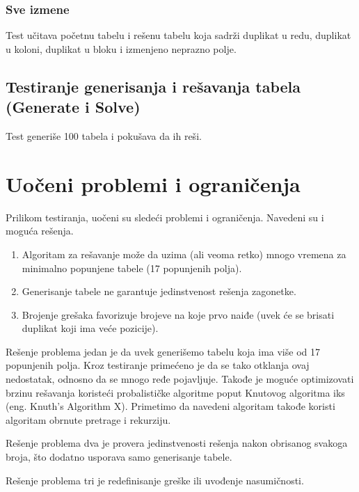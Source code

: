 \documentclass[a4paper]{article}
\begin{document}
    \subsubsection{Sve izmene}
    Test učitava početnu tabelu i rešenu tabelu koja sadrži duplikat u redu, duplikat u koloni, duplikat u bloku i izmenjeno neprazno polje.
    \subsection{Testiranje generisanja i rešavanja tabela (Generate i Solve)}
    Test generiše 100 tabela i pokušava da ih reši.

    \newpage
    \section{Uočeni problemi i ograničenja}
    Prilikom testiranja, uočeni su sledeći problemi i ograničenja. Navedeni su i moguća rešenja.
    \begin{enumerate}
        \item Algoritam za rešavanje može da uzima (ali veoma retko) mnogo vremena za minimalno popunjene tabele (17 popunjenih polja).
        \item Generisanje tabele ne garantuje jedinstvenost rešenja zagonetke.
        \item Brojenje grešaka favorizuje brojeve na koje prvo naiđe (uvek će se brisati duplikat koji ima veće pozicije).
    \end{enumerate}
    \par Rešenje problema jedan je da uvek generišemo tabelu koja ima više od 17 popunjenih polja. Kroz testiranje primećeno je da se tako otklanja ovaj nedostatak, odnosno da se
    mnogo ređe pojavljuje. Takođe je moguće optimizovati brzinu rešavanja koristeći probalističke algoritme poput Knutovog algoritma iks (eng. Knuth's Algorithm X). Primetimo da navedeni algoritam
    takođe koristi algoritam obrnute pretrage i rekurziju.
    \par Rešenje problema dva je provera jedinstvenosti rešenja nakon obrisanog svakoga broja, što dodatno usporava samo generisanje tabele.
    \par Rešenje problema tri je redefinisanje greške ili uvođenje nasumičnosti.
    \newpage
\end{document}
